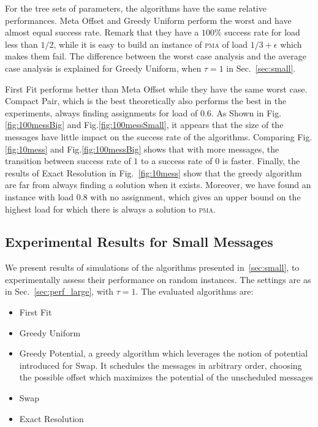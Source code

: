 \documentclass[a4paper,UKenglish,cleveref, autoref, thm-restate]{lipics-v2019}
\newcommand\pma{\textsc{pma}\xspace}
\begin{document}
For the tree sets of parameters, the algorithms have the same relative performances. Meta Offset and Greedy Uniform
perform the worst and have almost equal success rate. Remark that they have a $100\%$ success rate for load
less than $1/2$, while it is easy to build an instance of \pma of load $1/3 +\epsilon$ which makes them fail. 
The difference between the worst case analysis and the average case analysis is explained for Greedy Uniform, when $\tau = 1$ in Sec.~\ref{sec:small}.

First Fit performs better than Meta Offset while they have the same worst case. Compact Pair, which is the best theoretically also performs the best in the experiments, always finding assignments for load of 
$0.6$. As Shown in Fig.\ref{fig:100messBig} and Fig.\ref{fig:100messSmall}, it appears that the size of the messages have little impact on the success rate of the algorithms. Comparing Fig.\ref{fig:10mess} and Fig.\ref{fig:100messBig} shows that with more messages, the transition between success rate of $1$ to a success rate of $0$ is faster.
Finally, the results of Exact Resolution in Fig.~\ref{fig:10mess} show that the greedy algorithm are far from always finding a solution when it exists. Moreover, we have found an instance with load $0.8$ with no assignment, which gives an upper bound on the highest load for which there is always a solution to \pma.



\subsection{Experimental Results for Small Messages} \label{sec:perf_small}


We present results of simulations of the algorithms presented in~\ref{sec:small}, to experimentally assess their performance on random instances. The settings are as in Sec.~\ref{sec:perf_large}, with $\tau = 1$.
The evaluated algorithms are:

\begin{itemize}
  \item First Fit
  \item Greedy Uniform 
  \item Greedy Potential, a greedy algorithm which leverages the notion of potential introduced for Swap. 
  It schedules the messages in arbitrary order, choosing the possible offset which maximizes the potential of the unscheduled messages
  \item Swap 
  \item Exact Resolution
\end{itemize}
\end{document}

